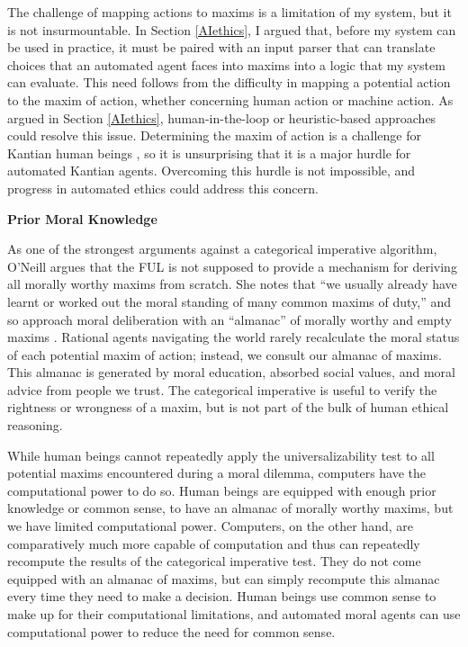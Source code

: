 \begin{isabellebody}
\begin{isamarkuptext}
The challenge of mapping actions to maxims is a limitation of my system, but it is not insurmountable. In Section \ref{AIethics},
I argued that, before my system can be used in practice, it must be paired with an input parser that can
translate choices that an automated agent faces into maxims into a logic that my system can
evaluate. This need follows from the difficulty in mapping a potential action
to the maxim of action, whether concerning human action or machine action. As argued in Section \ref{AIethics},  
human-in-the-loop or heuristic-based approaches could resolve this issue. Determining the maxim of 
action is a challenge for Kantian human beings \citep{oneilluniversallaws}, so it is unsurprising that 
it is a major hurdle for automated Kantian agents. Overcoming this hurdle is not impossible, and progress
in automated ethics could address this concern.

\medskip 

\noindent \textbf{Prior Moral Knowledge}

As one of the strongest arguments against a categorical imperative algorithm, O'Neill argues that 
the FUL is not supposed to provide a mechanism for deriving all morally worthy maxims from scratch. She notes
that ``we usually already have learnt or worked out the moral standing of many common maxims of duty,''
and so approach moral deliberation with an ``almanac'' of morally worthy and empty maxims \citep[394]{oneilluniversallaws}. 
Rational agents navigating the world rarely recalculate the moral status of each potential maxim of 
action; instead, we consult our almanac of maxims. This almanac is generated by moral education, 
absorbed social values, and moral advice from people we trust. The categorical imperative is useful 
to verify the rightness or wrongness of a maxim, but is not part of the bulk of human ethical reasoning.

While human beings cannot repeatedly apply the universalizability test to all potential maxims encountered during 
a moral dilemma, computers have the computational power to do so. Human beings are 
equipped with enough prior knowledge or common sense, to have an almanac of morally worthy maxims,
but we have limited computational power. Computers, on the other hand, are comparatively
much more capable of computation and thus can repeatedly recompute the results of the categorical
imperative test. They do not come equipped with an almanac of maxims, but can simply recompute this
almanac every time they need to make a decision. Human beings use common sense to make up for their computational
limitations, and automated moral agents can use computational power to reduce the need for common sense.


\end{isamarkuptext}
\end{isabellebody}
